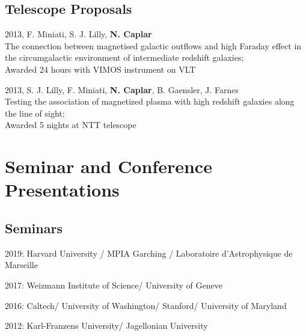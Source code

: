 \documentclass[11pt,letterpaper]{article}
\renewenvironment{itemize}{
  \begin{list}{}{
    \setlength{\leftmargin}{1.5em}
    \setlength{\itemsep}{0.10em}
    \setlength{\parskip}{0pt}
    \setlength{\parsep}{0.10em}
  }
}{
  \end{list}
}
\begin{document}
\newpage 


\subsection*{Telescope Proposals}
\begin{itemize}
\item 2013, F. Miniati, S. J. Lilly, \textbf{N. Caplar} \\ The connection between magnetised galactic outflows and high Faraday effect in the circumgalactic environment of intermediate redshift galaxies; \\ Awarded 24 hours with VIMOS instrument on VLT
\item 2013, S. J. Lilly, F. Miniati,  \textbf{N. Caplar}, B. Gaensler, J. Farnes  \\ Testing the association of magnetized plasma with high redshift galaxies along the line of sight; \\
Awarded 5 nights at NTT telescope
\end{itemize}

\section*{Seminar and Conference Presentations}
\subsection*{Seminars}
\begin{itemize}
\item 2019: Harvard University / MPIA Garching / Laboratoire d'Astrophysique de Marseille

\item 2017:  Weizmann Institute of Science/ University of Geneve

\item 2016: Caltech/ University of Washington/ Stanford/ University of Maryland

\item 2012:
Karl-Franzens University/ Jagellonian University
\end{itemize}
\end{document}
